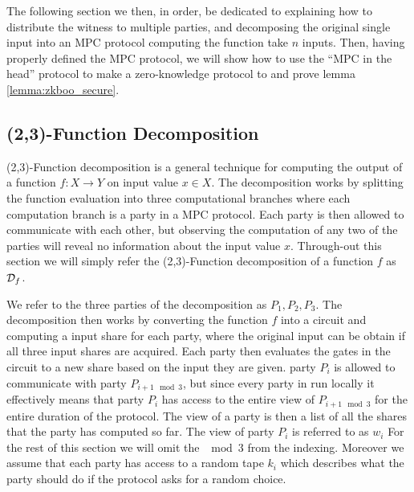 The following section we then, in order, be dedicated to explaining how to
distribute the witness to multiple parties, and decomposing the original single
input into an MPC protocol computing the function take $n$ inputs. Then, having
properly defined the MPC protocol, we will show how to use the ``MPC in the
head'' protocol to make a zero-knowledge protocol to and prove lemma \ref{lemma:zkboo_secure}.

\subsection{(2,3)-Function Decomposition}
\label{subsec:decomposition}
(2,3)-Function decomposition is a general technique for computing the output of
a function $f : X \rightarrow Y$ on input value $x \in X$.
The decomposition works by splitting the function evaluation into three
computational branches where each computation branch is a party in a MPC
protocol. Each party is then allowed to communicate with each other, but
observing the computation of any two of the parties will reveal no information
about the input value $x$.
Through-out this section we will simply refer the (2,3)-Function decomposition
of a function $f$ as $\mathcal{D}_{f}$.

We refer to the three parties of the decomposition as $P_{1}, P_{2}, P_{3}$. The
decomposition then works by converting the function $f$ into a circuit and
computing a input share for each party, where the original input can be obtain
if all three input shares are acquired.
Each party then evaluates the gates in the circuit to a new
share based on the input they are given. party $P_{i}$ is allowed to communicate
with party $P_{i+1 \mod 3}$, but since every party in run locally it effectively
means that party $P_{i}$ has access to the entire view of $P_{i+1 \mod 3}$ for
the entire duration of the protocol. The view of a party is then a list  of all the shares that
the party has computed so far. The view of party $P_{i}$ is referred to as
$w_{i}$ For the rest of this section we will omit the $\mod 3$ from the
indexing. Moreover we assume that each party has access to a random tape $k_{i}$
which describes what the party should do if the protocol asks for a random
choice.

